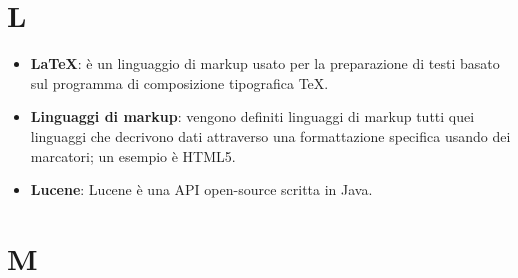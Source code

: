\documentclass[a4paper, oneside, openany]{article}
\begin{document}
\section{L}
\begin{itemize}
\item \textbf{\LaTeX}: è un linguaggio di markup usato per la preparazione di testi basato sul programma di composizione tipografica \TeX.
\item \textbf{Linguaggi di markup}: vengono definiti linguaggi di markup tutti quei linguaggi che decrivono dati attraverso una formattazione specifica usando dei marcatori; un esempio è HTML5.
\item \textbf{Lucene}: Lucene è una API open-source scritta in Java.
\end{itemize}

\section{M}
\end{document}
